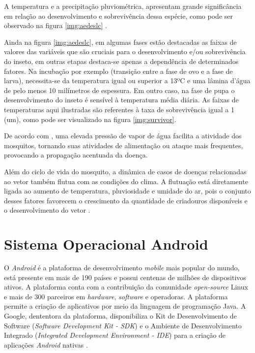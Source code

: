A temperatura e a precipitação pluviométrica, apresentam grande significância em relação ao desenvolvimento e sobrevivência dessa espécie, como pode ser observado na figura \ref{img:aedeslc} \cite{hopp2001global, ribeiro2006associaccao}. 

Ainda na figura \ref{img:aedeslc}, em algumas fases estão destacadas as faixas de valores das variáveis que são cruciais para o desenvolvimento e/ou sobrevivência do inseto, em outras etapas destaca-se apenas a dependência de determinados fatores. Na incubação por exemplo (transição entre a fase de ovo e a fase de larva), necessita-se da temperatura igual ou superior a 13ºC e uma lâmina d’água de pelo menos 10 milímetros de espessura. Em outro caso, na fase de pupa o desenvolvimento do inseto é sensível à temperatura média diária. As faixas de temperaturas aqui ilustradas são referentes à taxa de sobrevivência igual a 1 (um), como pode ser visualizado na figura \ref{img:survivor}.


 

De acordo com , uma elevada pressão de vapor de água facilita a atividade dos mosquitos, tornando suas atividades de alimentação ou ataque mais frequentes, provocando a propagação acentuada da doença.

Além do ciclo de vida do mosquito, a dinâmica de casos de doenças relacionadas ao vetor também flutua com as condições do clima. A flutuação está diretamente ligada ao aumento de temperatura, pluviosidade e umidade do ar, pois o conjunto desses fatores favorecem o crescimento da quantidade de criadouros disponíveis e o desenvolvimento do vetor \cite{ribeiro2006associaccao}.

\section{Sistema Operacional Android}

O \textit{Android} é a plataforma de desenvolvimento \textit{mobile} mais popular do mundo, está presente em mais de 190 países e possui centenas de milhões de dispositivos ativos. A plataforma conta com a contribuição da comunidade \textit{open-source} Linux e mais de 300 parceiros em \textit{hardware}, \textit{software} e operadoras. A plataforma permite a criação de aplicativos por meio da linguagem de programação Java. A Google, dententora da plataforma, disponibiliza o Kit de Desenvolvimento de Software (\textit{Software Development Kit - SDK}) e o Ambiente de Desenvolvimento Integrado (\textit{Integrated Development Environment - IDE}) para a criação de aplicações \textit{Android} nativas \cite{SITEANDROID}.

